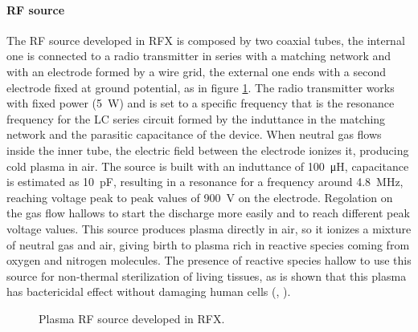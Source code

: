 \paragraph{RF source}
The RF source developed in RFX is composed by two coaxial tubes, the internal one is connected to a radio transmitter in series with a matching network and with an electrode formed by a wire grid, the external one ends with a second electrode fixed at ground potential, as in figure \ref{fig:RF}. The radio transmitter works with fixed power (\SI{5}{\watt}) and is set to a specific frequency that is the resonance frequency for the LC series circuit formed by the induttance in the matching network and the parasitic capacitance of the device. When neutral gas flows inside the inner tube, the electric field between the electrode ionizes it, producing cold plasma in air. The source is built with an induttance of \SI{100}{\micro\henry}, capacitance is estimated as \SI{10}{\pico\farad}, resulting in a resonance for a frequency around \SI{4.8}{\mega\hertz}, reaching voltage peak to peak values of \SI{900}{\volt} on the electrode. Regolation on the gas flow hallows to start the discharge more easily and to reach different peak voltage values.
This source produces plasma directly in air, so it ionizes a mixture of neutral gas and air, giving birth to plasma rich in reactive species coming from oxygen and nitrogen molecules. The presence of reactive species hallow to use this source for non-thermal sterilization of living tissues, as is shown that this plasma has bactericidal effect without damaging human cells (\cite{doi:10.1002/ppap.200700154}, \cite{Stoffels_2007}).
\begin{figure}
 \centering
 \hfill
 \caption{Plasma RF source developed in RFX.}
 \label{fig:RF}
\end{figure}


